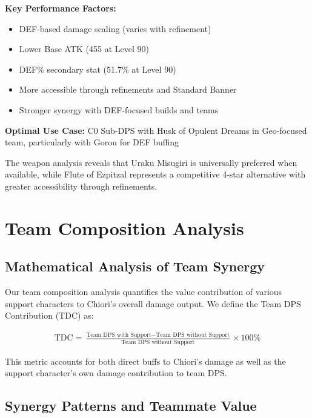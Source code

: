 \documentclass[12pt,a4paper]{article}
\begin{document}
\begin{tcolorbox}[colback=geoyellow!5, colframe=geoyellow, title=Flute of Ezpitzal (R5)]
\textbf{Key Performance Factors:}
\begin{itemize}
    \item DEF-based damage scaling (varies with refinement)
    \item Lower Base ATK (455 at Level 90)
    \item DEF\% secondary stat (51.7\% at Level 90)
    \item More accessible through refinements and Standard Banner
    \item Stronger synergy with DEF-focused builds and teams
\end{itemize}

\textbf{Optimal Use Case:} C0 Sub-DPS with Husk of Opulent Dreams in Geo-focused team, particularly with Gorou for DEF buffing
\end{tcolorbox}

The weapon analysis reveals that Uraku Misugiri is universally preferred when available, while Flute of Ezpitzal represents a competitive 4-star alternative with greater accessibility through refinements.

\section{Team Composition Analysis}

\subsection{Mathematical Analysis of Team Synergy}

Our team composition analysis quantifies the value contribution of various support characters to Chiori's overall damage output. We define the Team DPS Contribution (TDC) as:

\begin{align}
\text{TDC} = \frac{\text{Team DPS with Support} - \text{Team DPS without Support}}{\text{Team DPS without Support}} \times 100\%
\end{align}

This metric accounts for both direct buffs to Chiori's damage as well as the support character's own damage contribution to team DPS.

\subsection{Synergy Patterns and Teammate Value}
\end{document}
